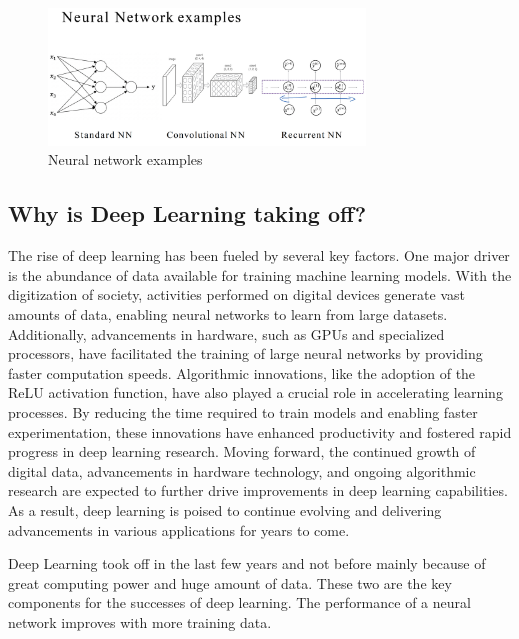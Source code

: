 \documentclass[letterpaper,12pt,notitlepage,twoside]{report}
\begin{document}
\begin{figure}[h]
	\centering
	\includegraphics[width=0.75\textwidth]{Images/Neural network examples.png}
	\caption{Neural network examples}
	\label{fig:3}
\end{figure}
\FloatBarrier

\subsection{Why is Deep Learning taking off?}
The rise of deep learning has been fueled by several key factors. One major driver is the abundance of data available for training machine learning models. With the digitization of society, activities performed on digital devices generate vast amounts of data, enabling neural networks to learn from large datasets. Additionally, advancements in hardware, such as GPUs and specialized processors, have facilitated the training of large neural networks by providing faster computation speeds. Algorithmic innovations, like the adoption of the ReLU activation function, have also played a crucial role in accelerating learning processes. By reducing the time required to train models and enabling faster experimentation, these innovations have enhanced productivity and fostered rapid progress in deep learning research. Moving forward, the continued growth of digital data, advancements in hardware technology, and ongoing algorithmic research are expected to further drive improvements in deep learning capabilities. As a result, deep learning is poised to continue evolving and delivering advancements in various applications for years to come.

\begin{funfact}[frametitle=\facttitlep{FunFact}{What's drives Deep Learning}]
Deep Learning took off in the last few years and not before mainly because of great computing power and huge amount of data. These two are the key components for the successes of deep learning. The performance of a neural network improves with more training data.
\end{funfact}
\end{document}
